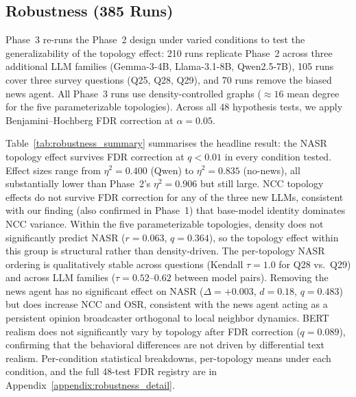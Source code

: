 \documentclass[11pt]{article}
\begin{document}
\subsection{Robustness (385 Runs)}
\label{sec:phase3}

Phase~3 re-runs the Phase~2 design under varied conditions to test the generalizability of the topology effect: 210 runs replicate Phase~2 across three additional LLM families (Gemma-3-4B, Llama-3.1-8B, Qwen2.5-7B), 105 runs cover three survey questions (Q25, Q28, Q29), and 70 runs remove the biased news agent. All Phase~3 runs use density-controlled graphs ($\approx 16$ mean degree for the five parameterizable topologies). Across all 48 hypothesis tests, we apply Benjamini--Hochberg FDR correction at $\alpha = 0.05$.

Table~\ref{tab:robustness_summary} summarises the headline result: the NASR topology effect survives FDR correction at $q < 0.01$ in every condition tested. Effect sizes range from $\eta^2 = 0.400$ (Qwen) to $\eta^2 = 0.835$ (no-news), all substantially lower than Phase~2's $\eta^2 = 0.906$ but still large. NCC topology effects do not survive FDR correction for any of the three new LLMs, consistent with our finding (also confirmed in Phase~1) that base-model identity dominates NCC variance. Within the five parameterizable topologies, density does not significantly predict NASR ($r = 0.063$, $q = 0.364$), so the topology effect within this group is structural rather than density-driven. The per-topology NASR ordering is qualitatively stable across questions (Kendall $\tau = 1.0$ for Q28 vs.\ Q29) and across LLM families ($\tau = 0.52$--$0.62$ between model pairs). Removing the news agent has no significant effect on NASR ($\Delta = +0.003$, $d = 0.18$, $q = 0.483$) but does increase NCC and OSR, consistent with the news agent acting as a persistent opinion broadcaster orthogonal to local neighbor dynamics. BERT realism does not significantly vary by topology after FDR correction ($q = 0.089$), confirming that the behavioral differences are not driven by differential text realism. Per-condition statistical breakdowns, per-topology means under each condition, and the full 48-test FDR registry are in Appendix~\ref{appendix:robustness_detail}.
\end{document}
